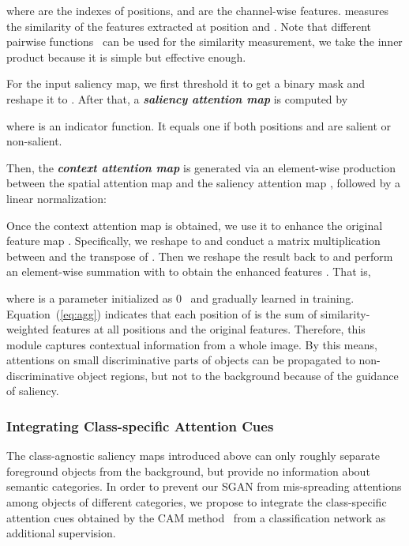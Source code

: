 \documentclass[journal]{IEEEtran}
\begin{document}
where  are the indexes of positions, and  are the channel-wise features.  measures the similarity of the features extracted at position  and . Note that different pairwise functions~\cite{Wang2018nonlocal} can be used for the similarity measurement, we take the inner product because it is simple but effective enough. 



For the input saliency map, we first threshold it to get a binary mask  and reshape it to . After that, a \textit{\textbf{saliency attention map}}  is computed by

where  is an indicator function. It equals one if both positions  and  are salient or non-salient.

Then, the \textit{\textbf{context attention map}}  is generated via an element-wise production between the spatial attention map  and the saliency attention map , followed by a linear normalization:


Once the context attention map  is obtained, we use it to enhance the original feature map . Specifically, we reshape  to  and conduct a matrix multiplication between  and the transpose of . Then we reshape the result back to  and perform an element-wise summation with  to obtain the enhanced features . That is,

where  is a parameter initialized as 0~\cite{fu2019dual} and gradually learned in training. Equation~(\ref{eq:agg}) indicates that each position of  is the sum of similarity-weighted features at all positions and the original features. Therefore, this module captures contextual information from a whole image. By this means, attentions on small discriminative parts of objects can be propagated to non-discriminative object regions, but not to the background because of the guidance of saliency.







\subsubsection{Integrating Class-specific Attention Cues} The class-agnostic saliency maps introduced above can only roughly separate foreground objects from the background, but provide no information about semantic categories. In order to prevent our SGAN from mis-spreading attentions among objects of different categories, we propose to integrate the class-specific attention cues obtained by the CAM method~\cite{zhou2016learning} from a classification network as additional supervision. 
\end{document}
